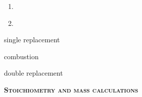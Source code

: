 \documentclass[main.tex]{subfiles}
\begin{document}
\begin{multicols*}{2}
\begin{question}[ID=\the\value{numA}]
\begin{enumerate} [topsep=0pt, partopsep=1pt, label=(\alph*), leftmargin=0.5cm]
\item	{}
\item	{\raggedleft {}}  \\ 
	\hspace*{\fill} 
\end{enumerate}
\end{question}\begin{solution}
\begin{inparaenum}[(a)]
 \item single replacement
 \item combustion
 \item double replacement
\end{inparaenum}\hspace{0.1cm}\end{solution}

{\raggedright\textsc{\textbf{Stoichiometry and mass calculations}}\par}


\end{multicols*}
\end{document}
